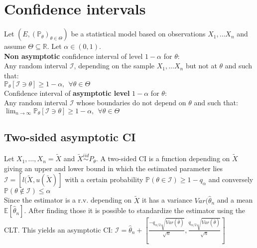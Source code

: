 \section{Confidence intervals}

Let $\displaystyle ( E,(\mathbb{P}_{\theta })_{\theta \in \Theta })$ be a statistical  model based on observations $X_{1} , \ldots X_{n}$  and assume $\displaystyle \Theta \subseteq \mathbb{R}$. Let $\displaystyle \alpha \in ( 0,1)$.\\

\textbf{Non asymptotic} confidence interval of level $\displaystyle 1-\alpha $ for $\displaystyle \theta $:\\

Any random interval $\displaystyle \mathcal{I}$, depending on the sample $X_{1} , \ldots X_{n}$ but not at $\displaystyle \theta $ and such that:\\

$\mathbb{P}_{\theta }[\mathcal{I} \ni \theta ] \geq 1-\alpha ,\ \ \forall \theta \in \Theta$\\

Confidence interval of \textbf{asymptotic level} $\displaystyle 1-\alpha $  for $\displaystyle \theta $:\\

Any random interval $\displaystyle \mathcal{I}$ whose boundaries do not depend on $\displaystyle \theta $ and such that:\\

$\lim _{n\rightarrow \infty }\mathbb{P}_{\theta } [\mathcal{I} \ni \theta ]\geq 1-\alpha ,\ \ \forall \theta \in \Theta $\\

\subsection*{Two-sided asymptotic CI}
Let $X_1, \ldots, X_n = \tilde{X}$ and $\tilde{X}\stackrel{iid} {\sim} P_{\theta}$. A two-sided CI is a function depending on $\tilde{X}$ giving an upper and lower bound in which the estimated parameter lies $\mathcal{I} = [l(\tilde{X},u(\tilde{X})]$ with a certain probability $\mathbb{P}(\theta \in  \mathcal{I}) \geq 1 -q_{\alpha}$ and conversely $\mathbb{P}(\theta \not\in  \mathcal{I}) \leq \alpha$\\

Since the estimator is a r.v. depending on $\tilde{X}$ it has a variance $Var(\hat{\theta}_n$ and a mean $\mathbb{E}[\hat{\theta}_n]$. After finding those it is possible to standardize the estimator using the CLT. This yields an asymptotic CI: $\mathcal{I} = \hat{\theta}_n + [\frac{-q_{\alpha /2} \sqrt{Var(\hat{\theta})} }{\sqrt{n}}, \frac{q_{\alpha /2} \sqrt{Var(\hat{\theta})} }{\sqrt{n}}]$

